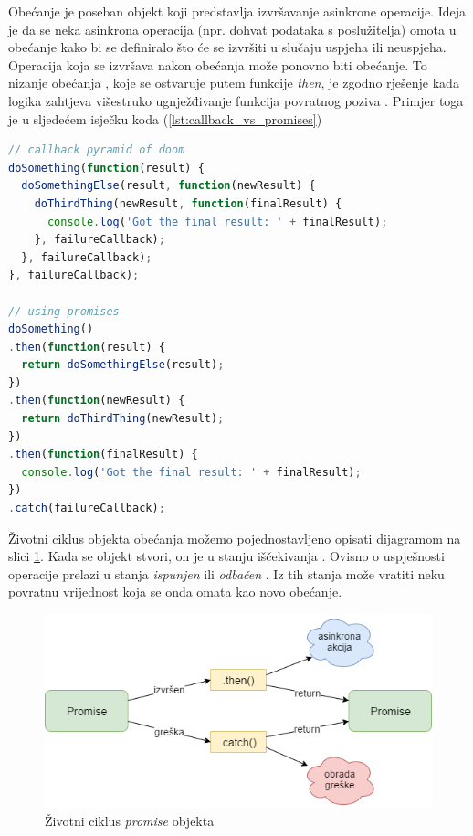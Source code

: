 \documentclass[times, utf8, zavrsni, numeric]{fer}
\newcommand{\razmakp}{\vspace{18pt}}
\newcommand{\razmaks}{\vspace{10pt}}
\begin{document}
Obećanje  je poseban objekt koji predstavlja izvršavanje asinkrone operacije.
Ideja je da se neka asinkrona operacija (npr. dohvat podataka s poslužitelja) omota u obećanje kako bi se definiralo što će se izvršiti u slučaju uspjeha ili neuspjeha.
Operacija koja se izvršava nakon obećanja može ponovno biti obećanje.
To nizanje obećanja , koje se ostvaruje putem funkcije \emph{then}, je zgodno rješenje kada logika zahtjeva višestruko ugnježđivanje funkcija povratnog poziva .\citep{MDNUsingPromises}
Primjer toga je u sljedećem isječku koda (\ref{lst:callback_vs_promises})

\razmakp
\begin{lstlisting}[language=JavaScript, caption={Korištenje obećanja umjesto ugnježđivanja funkcija povratnog poziva}, label={lst:callback_vs_promises}]
// callback pyramid of doom
doSomething(function(result) {
  doSomethingElse(result, function(newResult) {
    doThirdThing(newResult, function(finalResult) {
      console.log('Got the final result: ' + finalResult);
    }, failureCallback);
  }, failureCallback);
}, failureCallback);

// using promises
doSomething()
.then(function(result) {
  return doSomethingElse(result);
})
.then(function(newResult) {
  return doThirdThing(newResult);
})
.then(function(finalResult) {
  console.log('Got the final result: ' + finalResult);
})
.catch(failureCallback);
\end{lstlisting}
\razmaks

Životni ciklus objekta obećanja možemo pojednostavljeno opisati dijagramom na slici \ref{fig:promise_lifecycle}.
Kada se objekt stvori, on je u stanju iščekivanja .
Ovisno o uspješnosti operacije prelazi u stanja \emph{ispunjen}  ili \emph{odbačen} .
Iz tih stanja može vratiti neku povratnu vrijednost koja se onda omata kao novo obećanje.

\begin{figure}[htb]
\centering
\includegraphics[width=14cm]{img/promise.png}
\caption{Životni ciklus \emph{promise} objekta}
\label{fig:promise_lifecycle}
\end{figure}
\end{document}
